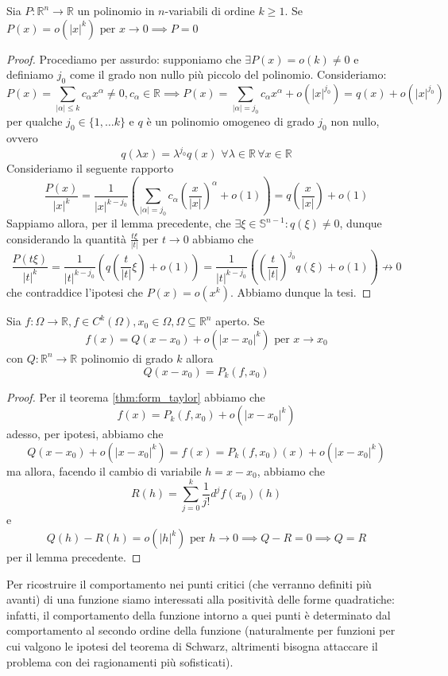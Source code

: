 \begin{lemma}
Sia $P:\mathbb{R}^n \to \mathbb{R}$ un polinomio in $n$-variabili di ordine $k \geq 1$. Se $P(x) = o(|x|^k) \text{ per } x \to 0 \implies P = 0$
\end{lemma}
\begin{proof} Procediamo per assurdo: supponiamo che $\exists P(x) = o(k) \neq 0$ e definiamo $j_0$ come il grado non nullo più piccolo del polinomio. Consideriamo:
$$
P(x) = \sum_{|\alpha| \leq k} c_{\alpha}x^{\alpha} \neq 0, c_{\alpha} \in \mathbb{R} \implies P(x) = \sum_{|\alpha| = j_0} c_{\alpha} x^{\alpha} + o(|x|^{j_0}) = q(x) + o(|x|^{j_0})
$$
per qualche $j_0 \in \{1, \ldots k \}$ e $q$ è un polinomio omogeneo di grado $j_0$ non nullo, ovvero 
$$
q(\lambda x) = \lambda^{j_0} q(x) \, \, \forall \lambda \in \mathbb{R} \, \forall x \in \mathbb{R}
$$
Consideriamo il seguente rapporto
$$
\frac{P(x)}{|x|^k} = \frac{1}{|x|^{k-j_0}} \left(\sum_{|\alpha|=j_0} c_{\alpha} \left( \frac{x}{|x|} \right)^{\alpha} + o(1) \right) = q \left( \frac{x}{|x|} \right)+o(1)
$$
Sappiamo allora, per il lemma precedente, che $\exists \xi \in \mathbb{S}^{n-1}: q(\xi) \neq 0$, dunque considerando la quantità $\frac{t\xi}{|t|}$ per $t \to 0$ abbiamo che
$$
\frac{P(t\xi)}{|t|^k} = \frac{1}{|t|^{k-j_0}} \left(q \left( \frac{t}{|t|}\xi \right) + o(1) \right) = \frac{1}{|t|^{k-j_0}} \left( \left( \frac{t}{|t|} \right)^{j_0} q(\xi) + o(1) \right) \not\to 0
$$
che contraddice l'ipotesi che $P(x) = o(x^k)$. Abbiamo dunque la tesi.
\end{proof}
\begin{theorem}
Sia $f: \Omega \to \mathbb{R}, f \in C^k(\Omega), x_0 \in \Omega, \Omega \subseteq \mathbb{R}^n$ aperto. Se
$$
f(x) = Q(x-x_0) + o(|x-x_0|^k) \text{ per } x \to x_0
$$
con $Q: \mathbb{R}^n \to \mathbb{R}$ polinomio di grado $k$ allora
$$
Q(x - x_0) = P_k(f, x_0)
$$
\end{theorem}
\begin{proof}
Per il teorema \ref{thm:form_taylor} abbiamo che
$$
f(x) = P_k(f, x_0) + o(|x-x_0|^k)
$$
adesso, per ipotesi, abbiamo che
$$
Q(x-x_0)+o(|x-x_0|^k) = f(x) = P_k(f, x_0)(x) + o(|x-x_0|^k)
$$
ma allora, facendo il cambio di variabile $h = x-x_0$, abbiamo che
$$
R(h) = \sum_{j=0}^k \frac{1}{j!} d^j f(x_0)(h)
$$
e
$$
Q(h) - R(h) = o(|h|^k) \text{ per } h \to 0 \implies Q - R = 0 \implies Q=R
$$
per il lemma precedente.
\end{proof}
Per ricostruire il comportamento nei punti critici (che verranno definiti più avanti) di una funzione siamo interessati alla positività delle forme quadratiche: infatti, il comportamento della funzione intorno a quei punti è determinato dal comportamento al secondo ordine della funzione (naturalmente per funzioni per cui valgono le ipotesi del teorema di Schwarz, altrimenti bisogna attaccare il problema con dei ragionamenti più sofisticati). \\
